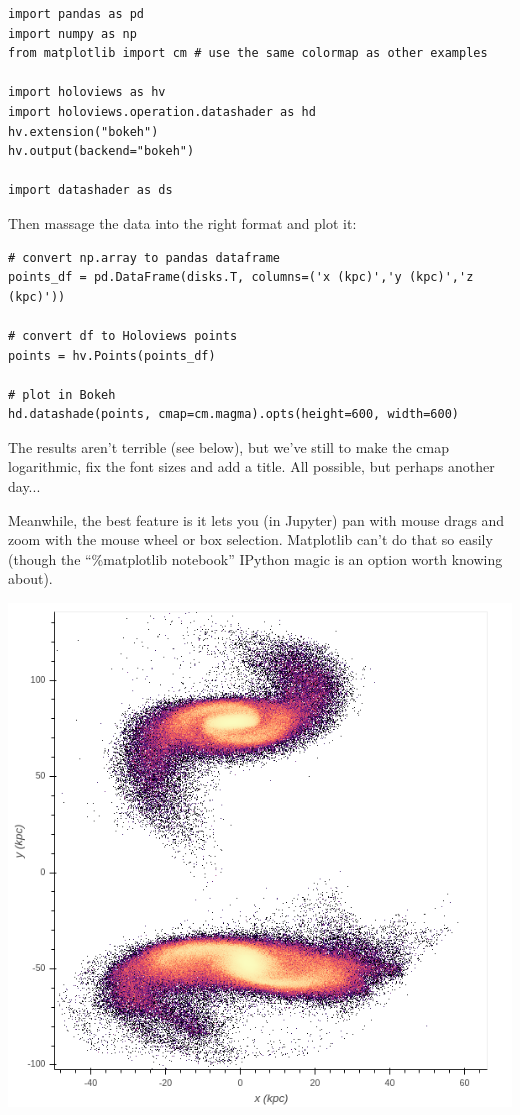 \lstset{style=py} 
\begin{lstlisting}
import pandas as pd
import numpy as np
from matplotlib import cm # use the same colormap as other examples

import holoviews as hv
import holoviews.operation.datashader as hd
hv.extension("bokeh") 
hv.output(backend="bokeh")

import datashader as ds
\end{lstlisting}

Then massage the data into the right format and plot it:

\begin{lstlisting}
# convert np.array to pandas dataframe
points_df = pd.DataFrame(disks.T, columns=('x (kpc)','y (kpc)','z (kpc)'))

# convert df to Holoviews points
points = hv.Points(points_df)

# plot in Bokeh
hd.datashade(points, cmap=cm.magma).opts(height=600, width=600)
\end{lstlisting}

The results aren't terrible (see below), but we've still to make the cmap logarithmic, fix the font sizes and add a title. All possible, but perhaps another day...

Meanwhile, the best feature is it lets you (in Jupyter) pan with mouse drags and zoom with the mouse wheel or box selection. Matplotlib can't do that so easily (though the ``\%matplotlib notebook'' IPython magic is an option worth knowing about).

{\centering \includegraphics[scale=0.65]{bokeh_datashade} \par}


